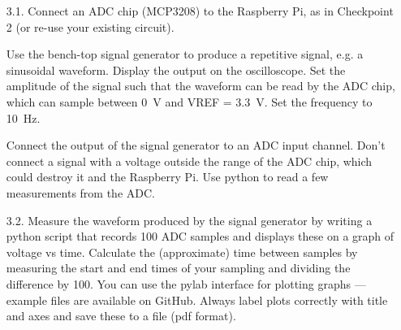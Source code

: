 \begin{enumerate}

\item [3.1.] Connect an ADC chip (MCP3208) to the Raspberry Pi, as in Checkpoint 2 (or re-use your existing circuit).

Use the bench-top signal generator to produce a repetitive signal, e.g. a sinusoidal waveform.
Display the output on the oscilloscope.
Set the amplitude of the signal such that the waveform can be read by the ADC chip, which can sample between 0~V and VREF = 3.3~V. Set the frequency to 10~Hz.

Connect the output of the signal generator to an ADC input channel.
Don't connect a signal with a voltage outside the range of the ADC chip, which could destroy it and the Raspberry Pi.
Use python to read a few measurements from the ADC.


\item [3.2.] Measure the waveform produced by the signal generator by writing a python script that records 100 ADC samples and displays these on a graph of voltage vs time.
Calculate the (approximate) time between samples by measuring the start and end times of your sampling and dividing the difference by 100.
You can use the pylab interface for plotting graphs --- example files are available on GitHub.
Always label plots correctly with title and axes and save these to a file (pdf format).




\end{enumerate}
